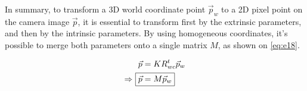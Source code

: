 \documentclass{article}
\newcounter{proofc}
\renewcommand\theproofc{(\arabic{proofc})}
\DeclareRobustCommand\stepproofc{\refstepcounter{proofc}\theproofc}
\begin{document}
In summary, to transform a 3D world coordinate point $\vec{p}_w$ to a 2D pixel point on the camera image $\vec{p}$, it is essential to transform first by the extrinsic parameters, and then by the intrinsic parameters. By using homogeneous coordinates, it's possible to merge both parameters onto a single matrix $M$, as shown on \eqref{eq:e18}.

\begin{alignat}{2}
\nonumber
\vec{p} &= KR^t_{wc} \vec{p}_w \\
\Rightarrow ~ \Aboxed{\vec{p} &= M \vec{p}_w} \label{eq:e18}
\end{alignat}















\newpage
\nocite{*}




\end{document}
